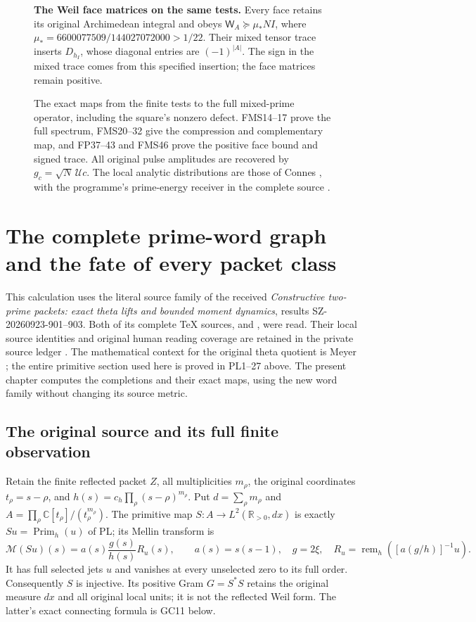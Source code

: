 \documentclass[11pt,a4paper]{article}
\theoremstyle{definition}\newtheorem{definition}[theorem]{Definition}
\newcommand{\C}{\mathbb C}\newcommand{\R}{\mathbb R}
\begin{document}
\begin{figure}[p]
\begin{minipage}{0.92\linewidth}
\medskip
\textbf{The Weil face matrices on the same tests.}
Every face retains its original Archimedean integral and obeys
$\mathsf W_A\succeq\mu_*N I$, where
$\mu_*=6600077509/144027072000>1/22$.
Their mixed tensor trace inserts $D_{h_I}$, whose diagonal entries
are $(-1)^{|A|}$. The sign in the mixed trace comes from this
specified insertion; the face matrices remain positive.
\end{minipage}
\caption{The exact maps from the finite tests to the full mixed-prime
operator, including the square's nonzero defect. FMS14--17 prove
the full spectrum, FMS20--32 give the compression and complementary
map, and FP37--43 and FMS46 prove the positive face bound and
signed trace. All original pulse amplitudes are recovered by
$g_c=\sqrt N\,\mathcal Uc$. The local analytic distributions
are those of Connes \cite{Connes2026}, with the programme's
prime-energy receiver in the complete source \cite{Edition033}.}
\end{figure}

\section{The complete prime-word graph and the fate of every packet class}
\label{sec:word-graph-completion}

This calculation uses the literal source family of the received
\emph{Constructive two-prime packets: exact theta lifts and bounded
moment dynamics}, results SZ-20260923-901--903. Both of its complete
TeX sources,  and , were read.
Their local source identities and original human reading coverage
are retained in the private source ledger \cite{ConstructiveTwoPrime}. The mathematical context
for the original theta quotient is Meyer \cite{Meyer}; the entire
primitive section used here is proved in PL1--27 above. The present
chapter computes the completions and their exact maps, using the
new word family without changing its source metric.

\subsection{The original source and its full finite observation}
Retain the finite reflected packet $Z$, all multiplicities
$m_\rho$, the original coordinates $t_\rho=s-\rho$, and
$h(s)=c_h\prod_\rho(s-\rho)^{m_\rho}$. Put
$d=\sum_\rho m_\rho$ and $A=\prod_\rho\C[t_\rho]/(t_\rho^{m_\rho})$.
The primitive map $S:A\to L^2(\R_{>0},dx)$ is exactly
$S u=\operatorname{Prim}_h(u)$ of PL; its Mellin transform is
\[
 \mathcal M(Su)(s)=a(s)\frac{g(s)}{h(s)}R_u(s),\qquad
 a(s)=s(s-1),\quad g=2\xi,\quad
 R_u=\operatorname{rem}_h([a(g/h)]^{-1}u).
 \tag{GC1}\label{gc:section}
\]
It has full selected jets $u$ and vanishes at every unselected
zero to its full order. Consequently $S$ is injective. Its
positive Gram $G=S^*S$ retains the original measure $dx$ and all
original local units; it is not the reflected Weil form.
The latter's exact connecting formula is GC11 below.
\end{document}
